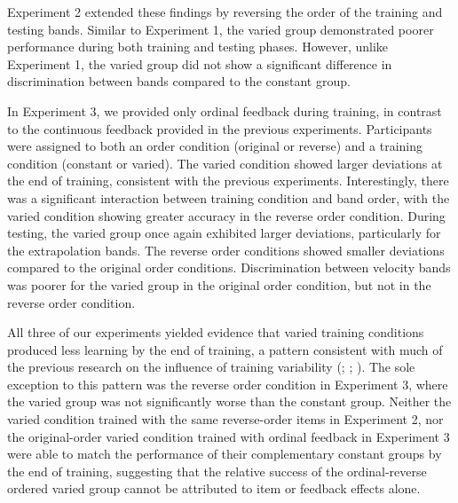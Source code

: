 \documentclass[
  11pt,
  letterpaper,
]{article}
\begin{document}
Experiment 2 extended these findings by reversing the order of the
training and testing bands. Similar to Experiment 1, the varied group
demonstrated poorer performance during both training and testing phases.
However, unlike Experiment 1, the varied group did not show a
significant difference in discrimination between bands compared to the
constant group.

In Experiment 3, we provided only ordinal feedback during training, in
contrast to the continuous feedback provided in the previous
experiments. Participants were assigned to both an order condition
(original or reverse) and a training condition (constant or varied). The
varied condition showed larger deviations at the end of training,
consistent with the previous experiments. Interestingly, there was a
significant interaction between training condition and band order, with
the varied condition showing greater accuracy in the reverse order
condition. During testing, the varied group once again exhibited larger
deviations, particularly for the extrapolation bands. The reverse order
conditions showed smaller deviations compared to the original order
conditions. Discrimination between velocity bands was poorer for the
varied group in the original order condition, but not in the reverse
order condition.

All three of our experiments yielded evidence that varied training
conditions produced less learning by the end of training, a pattern
consistent with much of the previous research on the influence of
training variability
(;
;
). The sole exception to this pattern was the reverse order
condition in Experiment 3, where the varied group was not significantly
worse than the constant group. Neither the varied condition trained with
the same reverse-order items in Experiment 2, nor the original-order
varied condition trained with ordinal feedback in Experiment 3 were able
to match the performance of their complementary constant groups by the
end of training, suggesting that the relative success of the
ordinal-reverse ordered varied group cannot be attributed to item or
feedback effects alone.
\end{document}
